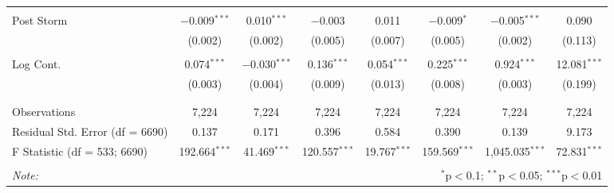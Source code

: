\begin{table}[!htbp]
\begin{tabular}{@{\extracolsep{5pt}}lccccccc}
  & & & & & & & \\ 
 Post Storm & $-$0.009$^{***}$ & 0.010$^{***}$ & $-$0.003 & 0.011 & $-$0.009$^{*}$ & $-$0.005$^{***}$ & 0.090 \\ 
  & (0.002) & (0.002) & (0.005) & (0.007) & (0.005) & (0.002) & (0.113) \\ 
  & & & & & & & \\ 
 Log Cont. & 0.074$^{***}$ & $-$0.030$^{***}$ & 0.136$^{***}$ & 0.054$^{***}$ & 0.225$^{***}$ & 0.924$^{***}$ & 12.081$^{***}$ \\ 
  & (0.003) & (0.004) & (0.009) & (0.013) & (0.008) & (0.003) & (0.199) \\ 
  & & & & & & & \\ 
\hline \\[-1.8ex] 
Observations & 7,224 & 7,224 & 7,224 & 7,224 & 7,224 & 7,224 & 7,224 \\ 
Residual Std. Error (df = 6690) & 0.137 & 0.171 & 0.396 & 0.584 & 0.390 & 0.139 & 9.173 \\ 
F Statistic (df = 533; 6690) & 192.664$^{***}$ & 41.469$^{***}$ & 120.557$^{***}$ & 19.767$^{***}$ & 159.569$^{***}$ & 1,045.035$^{***}$ & 72.831$^{***}$ \\ 
\hline 
\hline \\[-1.8ex] 
\textit{Note:}  & \multicolumn{7}{r}{$^{*}$p$<$0.1; $^{**}$p$<$0.05; $^{***}$p$<$0.01} \\ 
\end{tabular} 
\end{table} 

